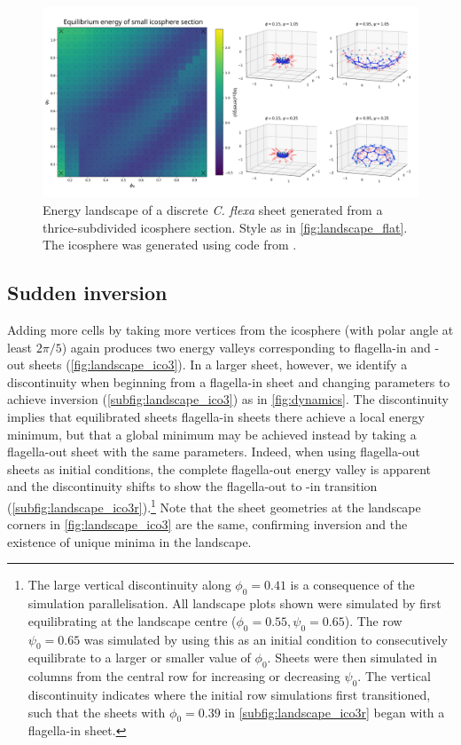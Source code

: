 \begin{figure}[hbtp]
	\centering
	\includegraphics[width=\textwidth]{landscape_ico.png}
	\caption[Energy landscape of a discrete \textit{C. flexa} sheet generated from a small icosphere section]{Energy landscape of a discrete \textit{C. flexa} sheet generated from a thrice-subdivided icosphere section. Style as in \cref{fig:landscape_flat}. The icosphere was generated using code from \citep{dahl2014}.}
	\label{fig:landscape_ico}
\end{figure}

\subsection{Sudden inversion}

Adding more cells by taking more vertices from the icosphere (with polar angle at least $2\pi/5$) again produces two energy valleys corresponding to flagella-in and -out sheets (\cref{fig:landscape_ico3}). 
In a larger sheet, however, we identify a discontinuity when beginning from a flagella-in sheet and changing parameters to achieve inversion (\cref{subfig:landscape_ico3}) as in \cref{fig:dynamics}.
The discontinuity implies that equilibrated sheets flagella-in sheets there achieve a local energy minimum, but that a global minimum may be achieved instead by taking a flagella-out sheet with the same parameters. 
Indeed, when using flagella-out sheets as initial conditions, the complete flagella-out energy valley is apparent and the discontinuity shifts to show the flagella-out to -in transition (\cref{subfig:landscape_ico3r}).\footnote{The large vertical discontinuity along $\phi_0=0.41$ is a consequence of the simulation parallelisation. All landscape plots shown were simulated by first equilibrating at the landscape centre ($\phi_0=0.55,\psi_0=0.65$). The row $\psi_0=0.65$ was simulated by using this as an initial condition to consecutively equilibrate to a larger or smaller value of $\phi_0$. Sheets were then simulated in columns from the central row for increasing or decreasing $\psi_0$. The vertical discontinuity indicates where the initial row simulations first transitioned, such that the sheets with $\phi_0=0.39$ in \cref{subfig:landscape_ico3r} began with a flagella-in sheet.}
Note that the sheet geometries at the landscape corners in \cref{fig:landscape_ico3} are the same, confirming inversion and the existence of unique minima in the landscape.

